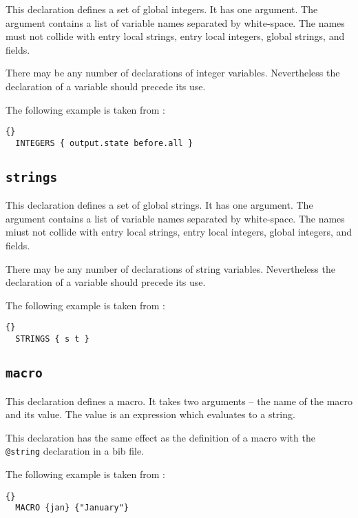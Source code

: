 This declaration defines a set of global integers. It has one
argument. The argument contains a list of variable names separated by
white-space. The names must not collide with entry local strings,
entry local integers, global strings, and fields.

There may be any number of declarations of integer variables.
Nevertheless the declaration of a variable should precede its use.

The following example is taken from :

\begin{lstlisting}{}
  INTEGERS { output.state before.all }
\end{lstlisting}


\subsection{\texttt{strings}}

This declaration defines a set of global strings. It has one argument.
The argument contains a list of variable names separated by
white-space. The names miust not collide with entry local strings,
entry local integers, global integers, and fields.

There may be any number of declarations of string variables.
Nevertheless the declaration of a variable should precede its use.

The following example is taken from :

\begin{lstlisting}{}
  STRINGS { s t }
\end{lstlisting}


\subsection{\texttt{macro}}

This declaration defines a macro. It takes two arguments -- the name
of the macro and its value. The value is an expression which evaluates
to a string.

This declaration has the same effect as the definition of a macro with
the \texttt{@string} declaration in a bib file.

The following example is taken from :

\begin{lstlisting}{}
  MACRO {jan} {"January"}
\end{lstlisting}


